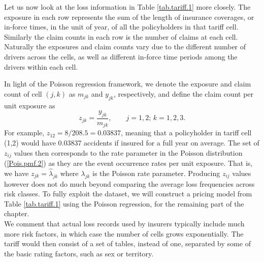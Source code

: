 \documentclass[12pt]{article}
\begin{document}
Let us now look at the loss information in Table \ref{tab.tariff.1} more closely. The exposure in each row represents the sum of the length of insurance coverages, or in-force times, in the unit of year, of all the policyholders in that tariff cell. Similarly the claim counts in each row is the number of claims at each cell. Naturally the exposures and claim counts vary due to the different number of drivers across the cells, as well as different in-force time periods among the drivers within each cell.

In light of the Poisson regression framework, we denote the exposure and claim count of cell $(j,k)$ as $m_{jk}$ and $y_{jk}$, respectively, and define the claim count per unit exposure as
\begin{equation}
\label{z.jk}\nonumber
z_{jk}= \frac{y_{jk}}{ m_{jk}}, \qquad j=1,2;\, k=1, 2,3.
\end{equation}
For example, $z_{12}=8/208.5=0.03837$, meaning that a policyholder in tariff cell (1,2) would have 0.03837 accidents if insured for a full year on average. The set of $z_{ij}$ values then corresponds to the rate parameter in the Poisson distribution (\ref{Pois.pmf.2}) as they are the event occurrence rates per unit exposure. That is, we have $z_{jk}=\hat{\lambda}_{jk}$ where ${\lambda}_{jk}$ is the Poisson rate parameter. Producing $z_{ij}$ values however does not do much beyond comparing the average loss frequencies across risk classes. To fully exploit the dataset, we will construct a pricing model from Table \ref{tab.tariff.1} using the Poisson regression, for the remaining part of the chapter. \\

We comment that actual loss records used by insurers typically include much more risk factors, in which case  the number of cells grows exponentially. The tariff would then consist of a set of tables, instead of one, separated by some of the basic rating factors, such as sex or territory. 



\end{document}
